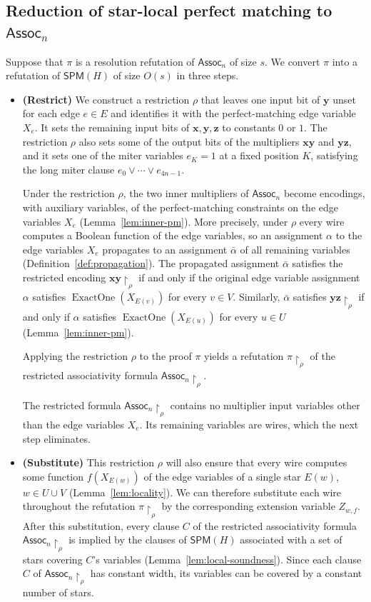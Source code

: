 \documentclass[11pt]{article}
\theoremstyle{definition}
\theoremstyle{remark}
\newcommand{\Assoc}{\mathsf{Assoc}}
\newcommand{\SPM}{\mathsf{SPM}}
\newcommand{\vv}[1]{\mathbf{#1}}
\begin{document}
\subsection{Reduction of star-local perfect matching to \texorpdfstring{$\Assoc_n$}{Assoc\_n}}
\label{sec:outline-reduction}

Suppose that $\pi$ is a resolution refutation of $\Assoc_n$ of size $s$. We convert $\pi$ into a refutation of $\SPM(H)$ of size $O(s)$ in
three steps.

\begin{itemize}
\item \textbf{(Restrict)} We construct a restriction $\rho$ that leaves one input bit of $\vv{y}$ unset for each edge $e\in E$ and
identifies it with the perfect-matching edge variable $X_e$. It sets the remaining input bits of $\vv{x}, \vv{y}, \vv{z}$ to constants $0$ or
$1$. The restriction $\rho$ also sets some of the output bits of the multipliers $\vv{x}\vv{y}$ and $\vv{y}\vv{z}$, and it sets one of the
miter variables $e_K=1$ at a fixed position $K$, satisfying the long miter clause $e_0\vee\cdots\vee e_{4n-1}$.

Under the restriction $\rho$, the two
inner multipliers of $\Assoc_n$ become encodings, with auxiliary variables, of the
perfect-matching constraints on the edge variables $X_e$ (Lemma~\ref{lem:inner-pm}). More precisely, under $\rho$ every wire computes a Boolean function of the edge variables, so an assignment $\alpha$ to the
edge variables $X_e$ propagates to an assignment $\bar\alpha$ of all remaining variables (Definition~\ref{def:propagation}). The propagated
assignment $\bar\alpha$ satisfies the restricted encoding $\vv{x}\vv{y}\!\upharpoonright_{\rho}$ if and only if the original edge variable assignment $\alpha$ satisfies
$\operatorname{ExactOne}(X_{E(v)})$ for every $v\in V$. Similarly, $\bar\alpha$ satisfies $\vv{y}\vv{z}\!\upharpoonright_{\rho}$ if and only if $\alpha$
satisfies $\operatorname{ExactOne}(X_{E(u)})$ for every $u\in U$ (Lemma~\ref{lem:inner-pm}).

Applying the restriction $\rho$ to the proof $\pi$ yields a refutation $\pi\!\upharpoonright_\rho$ of the restricted associativity formula
$\Assoc_n\!\upharpoonright_\rho$. 

The restricted formula $\Assoc_n\!\upharpoonright_\rho$ contains no multiplier input variables other than the edge variables $X_e$. Its
remaining variables are wires, which the next step eliminates.

\item \textbf{(Substitute)} This restriction $\rho$ will also ensure that every wire computes some function
$f(X_{E(w)})$ of the edge variables of a single star $E(w)$, $w \in U \cup V$ (Lemma~\ref{lem:locality}). We can therefore substitute each
wire throughout the refutation $\pi\!\upharpoonright_\rho$ by the corresponding extension variable $Z_{w,f}$.
After this substitution, every clause $C$ of the restricted associativity
formula $\Assoc_n\!\upharpoonright_\rho$ is implied by the clauses of $\SPM(H)$ associated
with a set of stars covering $C$'s variables (Lemma~\ref{lem:local-soundness}). Since each clause $C$ of $\Assoc_n\!\upharpoonright_\rho$ has constant width, its variables can be covered by a constant number of stars.


\end{itemize}
\end{document}
